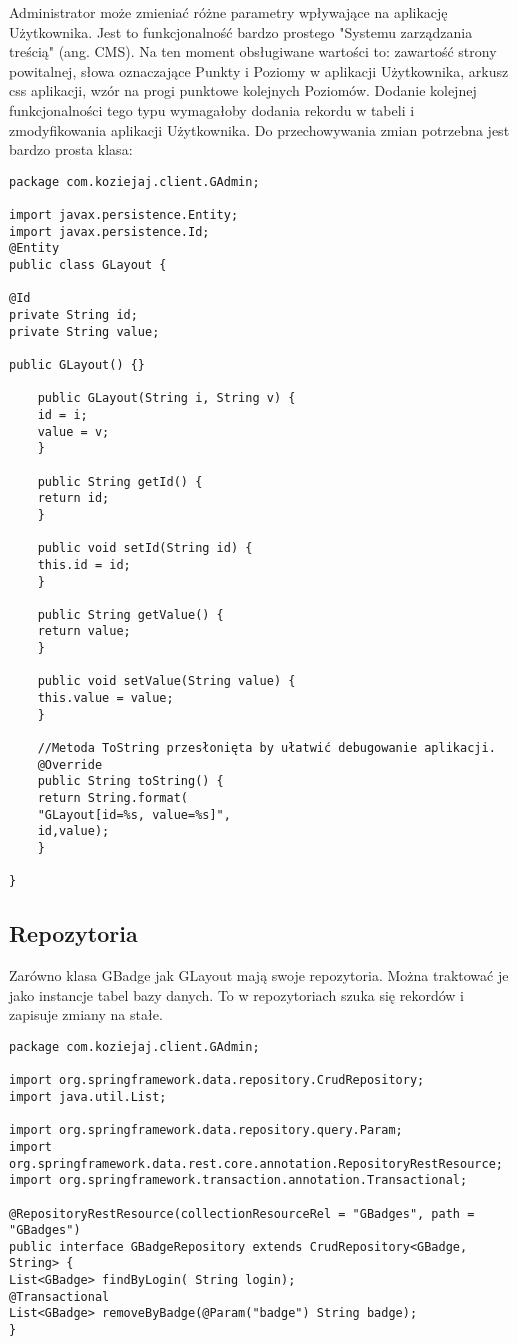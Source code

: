 \documentclass[a4paper,12pt,twoside,openany]{report}
\begin{document}
Administrator może zmieniać różne parametry wpływające na aplikację Użytkownika. Jest to funkcjonalność bardzo prostego "Systemu zarządzania treścią" (ang. CMS). Na ten moment obsługiwane wartości to: zawartość strony powitalnej, słowa oznaczające Punkty i Poziomy w aplikacji Użytkownika, arkusz css aplikacji, wzór na progi punktowe kolejnych Poziomów. Dodanie kolejnej funkcjonalności tego typu wymagałoby dodania rekordu w tabeli i zmodyfikowania aplikacji Użytkownika. Do przechowywania zmian potrzebna jest bardzo prosta klasa: 
\begin{lstlisting}
package com.koziejaj.client.GAdmin;

import javax.persistence.Entity;
import javax.persistence.Id;
@Entity
public class GLayout {

@Id
private String id;
private String value;

public GLayout() {}

	public GLayout(String i, String v) {
	id = i;
	value = v;
	}

	public String getId() {
	return id;
	}

	public void setId(String id) {
	this.id = id;
	}

	public String getValue() {
	return value;
	}

	public void setValue(String value) {
	this.value = value;
	}
	
	//Metoda ToString przesłonięta by ułatwić debugowanie aplikacji.
	@Override
	public String toString() {
	return String.format(
	"GLayout[id=%s, value=%s]",
	id,value);
	}

}

\end{lstlisting}
\subsection{Repozytoria}
Zarówno klasa GBadge jak GLayout mają swoje repozytoria. Można traktować je jako instancje tabel bazy danych. To w repozytoriach szuka się rekordów i zapisuje zmiany na stałe.
\begin{lstlisting}
package com.koziejaj.client.GAdmin;

import org.springframework.data.repository.CrudRepository;
import java.util.List;

import org.springframework.data.repository.query.Param;
import org.springframework.data.rest.core.annotation.RepositoryRestResource;
import org.springframework.transaction.annotation.Transactional;

@RepositoryRestResource(collectionResourceRel = "GBadges", path = "GBadges")
public interface GBadgeRepository extends CrudRepository<GBadge, String> {
List<GBadge> findByLogin( String login);
@Transactional
List<GBadge> removeByBadge(@Param("badge") String badge);
}
\end{lstlisting}
\end{document}
